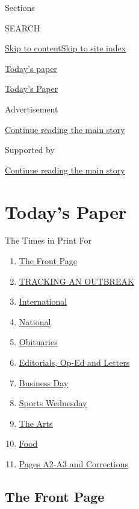 Sections

SEARCH

\protect\hyperlink{site-content}{Skip to
content}\protect\hyperlink{site-index}{Skip to site index}

\href{https://www.nytimes3xbfgragh.onion/section/todayspaper}{Today's
paper}

\href{https://myaccount.nytimes3xbfgragh.onion/auth/login?response_type=cookie\&client_id=vi}{}

\href{https://www.nytimes3xbfgragh.onion/section/todayspaper}{Today's
Paper}

Advertisement

\protect\hyperlink{after-top}{Continue reading the main story}

Supported by

\protect\hyperlink{after-sponsor}{Continue reading the main story}

\hypertarget{todays-paper}{%
\section{Today's Paper}\label{todays-paper}}

The Times in Print For

\begin{enumerate}
\def\labelenumi{\arabic{enumi}.}
\tightlist
\item
  \protect\hyperlink{thefrontpage}{The Front Page}
\item
  \protect\hyperlink{trackinganoutbreak}{TRACKING AN OUTBREAK}
\item
  \protect\hyperlink{international}{International}
\item
  \protect\hyperlink{national}{National}
\item
  \protect\hyperlink{obituaries}{Obituaries}
\item
  \protect\hyperlink{editorialsux2cop-edandletters}{Editorials, Op-Ed
  and Letters}
\item
  \protect\hyperlink{businessday}{Business Day}
\item
  \protect\hyperlink{sportswednesday}{Sports Wednesday}
\item
  \protect\hyperlink{thearts}{The Arts}
\item
  \protect\hyperlink{food}{Food}
\item
  \protect\hyperlink{pagesa2-a3andcorrections}{Pages A2-A3 and
  Corrections}
\end{enumerate}

\hypertarget{the-front-page}{%
\subsection{The Front Page}\label{the-front-page}}

